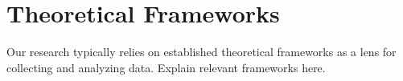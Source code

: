 \section{Theoretical Frameworks}\label{sec:theory}

Our research typically relies on established theoretical frameworks as a lens
for collecting and analyzing data. Explain relevant frameworks here.
